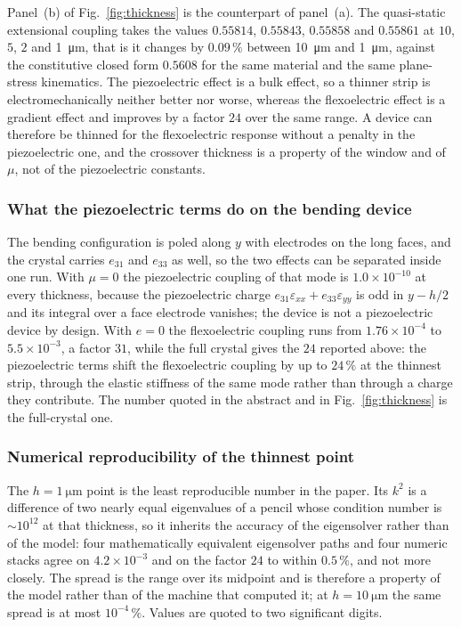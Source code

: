 Panel~(b) of Fig.~\ref{fig:thickness} is the counterpart of panel~(a). The
quasi-static extensional coupling takes the values $0.55814$, $0.55843$,
$0.55858$ and $0.55861$ at $10$, $5$, $2$ and \SI{1}{\micro\metre}, that is it
changes by $0.09\,\%$ between \SI{10}{\micro\metre} and \SI{1}{\micro\metre},
against the constitutive closed form $0.5608$ for the same material and the
same plane-stress kinematics. The piezoelectric effect is a bulk effect, so a
thinner strip is electromechanically neither better nor worse, whereas the
flexoelectric effect is a gradient effect and improves by a factor $24$ over
the same range. A device can therefore be thinned for the flexoelectric
response without a penalty in the piezoelectric one, and the crossover
thickness is a property of the window and of $\mu$, not of the piezoelectric
constants.

\subsubsection{What the piezoelectric terms do on the bending device}

The bending configuration is poled along $y$ with electrodes on the long faces,
and the crystal carries $e_{31}$ and $e_{33}$ as well, so the two effects can
be separated inside one run. With $\mu=0$ the piezoelectric coupling of that
mode is $1.0\times10^{-10}$ at every thickness, because the piezoelectric charge
$e_{31}\varepsilon_{xx}+e_{33}\varepsilon_{yy}$ is odd in $y-h/2$ and its
integral over a face electrode vanishes; the device is not a piezoelectric
device by design. With $e=0$ the flexoelectric coupling runs from
$1.76\times10^{-4}$ to $5.5\times10^{-3}$, a factor $31$, while the full crystal
gives the $24$ reported above: the piezoelectric terms shift the flexoelectric
coupling by up to $24\,\%$ at the thinnest strip, through the elastic stiffness
of the same mode rather than through a charge they contribute. The number
quoted in the abstract and in Fig.~\ref{fig:thickness} is the full-crystal one.

\subsubsection{Numerical reproducibility of the thinnest point}

The $h=\SI{1}{\micro\metre}$ point is the least reproducible number in the
paper. Its $k^2$ is a difference of two nearly equal eigenvalues of a pencil
whose condition number is $\sim10^{12}$ at that thickness, so it inherits the
accuracy of the eigensolver rather than of the model: four mathematically
equivalent eigensolver paths and four numeric stacks agree on
$4.2\times10^{-3}$ and on the factor $24$ to within $0.5\,\%$, and not more
closely. The spread is the range over its midpoint and is therefore a property
of the model rather than of the machine that computed it; at
$h=\SI{10}{\micro\metre}$ the same spread is at most $10^{-4}\,\%$. Values
are quoted to two significant digits.


